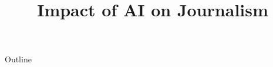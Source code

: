 \documentclass[xcolor=dvipsnames,compress,t,pdf,9pt]{beamer}
\title[\insertframenumber /\inserttotalframenumber]{Impact of AI on Journalism} %
\begin{document}
	\begin{frame}
	\titlepage
	\end{frame}
	
	\begin{frame}{Outline}
	    \tableofcontents
	\end{frame}

	
	
	
\end{document}
